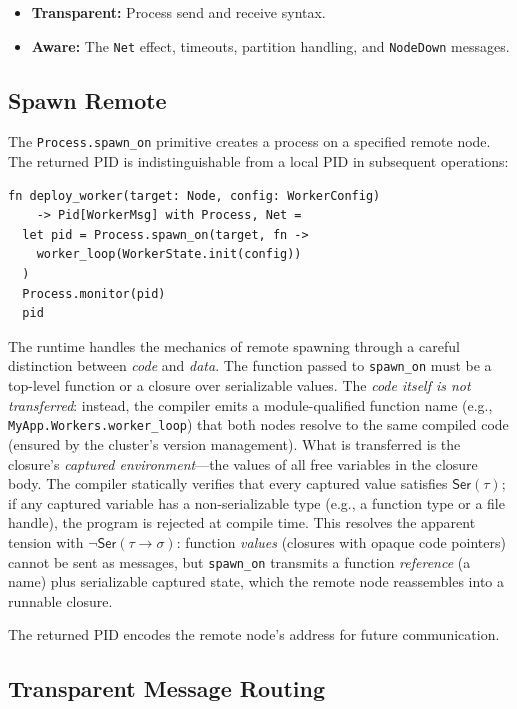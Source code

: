 \documentclass[11pt,a4paper]{article}
\newcommand{\Ser}{\mathsf{Ser}}
\begin{document}
\begin{itemize}[nosep]
  \item \textbf{Transparent:} Process send and receive syntax.
  \item \textbf{Aware:} The \texttt{Net} effect, timeouts, partition
        handling, and \texttt{NodeDown} messages.
\end{itemize}

\subsection{Spawn Remote}

The \texttt{Process.spawn\_on} primitive creates a process on a specified
remote node. The returned PID is indistinguishable from a local PID in
subsequent operations:

\begin{lstlisting}
fn deploy_worker(target: Node, config: WorkerConfig)
    -> Pid[WorkerMsg] with Process, Net =
  let pid = Process.spawn_on(target, fn ->
    worker_loop(WorkerState.init(config))
  )
  Process.monitor(pid)
  pid
\end{lstlisting}

The runtime handles the mechanics of remote spawning through a careful
distinction between \emph{code} and \emph{data}. The function passed to
\texttt{spawn\_on} must be a top-level function or a closure over
serializable values. The \emph{code itself is not transferred}: instead,
the compiler emits a module-qualified function name (e.g.,
\texttt{MyApp.Workers.worker\_loop}) that both nodes resolve to the same
compiled code (ensured by the cluster's version management). What is
transferred is the closure's \emph{captured environment}---the values of
all free variables in the closure body. The compiler statically verifies
that every captured value satisfies $\Ser(\tau)$; if any captured variable
has a non-serializable type (e.g., a function type or a file handle), the
program is rejected at compile time. This resolves the apparent tension
with $\neg\Ser(\tau \to \sigma)$: function \emph{values} (closures with
opaque code pointers) cannot be sent as messages, but \texttt{spawn\_on}
transmits a function \emph{reference} (a name) plus serializable captured
state, which the remote node reassembles into a runnable closure.

The returned PID encodes the remote node's address for future communication.

\subsection{Transparent Message Routing}
\end{document}
